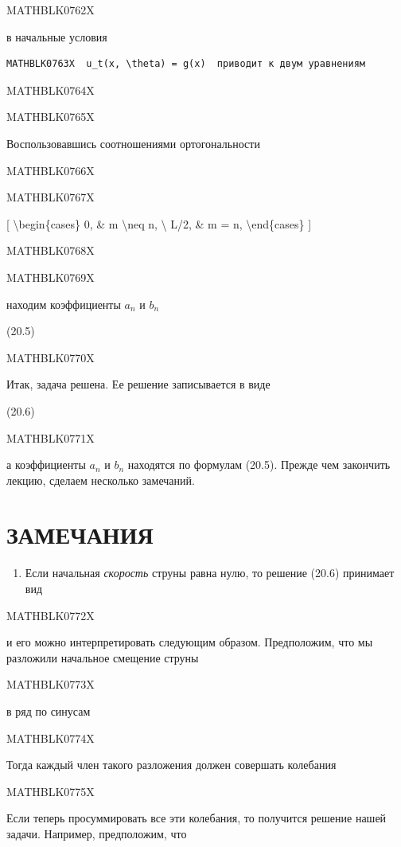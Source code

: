 \documentclass[
]{article}
\providecommand{\tightlist}{%
  \setlength{\itemsep}{0pt}\setlength{\parskip}{0pt}}
\begin{document}
{{MATHBLK0762X

в начальные условия

\begin{verbatim}
MATHBLK0763X  u_t(x, \theta) = g(x)  приводит к двум уравнениям
\end{verbatim}

MATHBLK0764X

MATHBLK0765X

Воспользовавшись соотношениями ортогональности

MATHBLK0766X

MATHBLK0767X

{[} \textbackslash begin\{cases\} 0, \& m \textbackslash neq n,
\textbackslash{} L/2, \& m = n, \textbackslash end\{cases\} {]}

MATHBLK0768X

MATHBLK0769X

находим коэффициенты \(a_n\) и \(b_n\)

(20.5)

MATHBLK0770X

Итак, задача решена. Ее решение записывается в виде

(20.6)

MATHBLK0771X

а коэффициенты \(a_n\) и \(b_n\) находятся по формулам (20.5). Прежде
чем закончить лекцию, сделаем несколько замечаний.

\section{ЗАМЕЧАНИЯ}\label{ux437ux430ux43cux435ux447ux430ux43dux438ux44f-5}

\begin{enumerate}
\def\labelenumi{\arabic{enumi}.}
\tightlist
\item
  Если начальная \emph{скорость} струны равна нулю, то решение (20.6)
  принимает вид
\end{enumerate}

MATHBLK0772X

и его можно интерпретировать следующим образом. Предположим, что мы
разложили начальное смещение струны

MATHBLK0773X

в ряд по синусам

MATHBLK0774X

Тогда каждый член такого разложения должен совершать колебания

MATHBLK0775X

Если теперь просуммировать все эти колебания, то получится решение нашей
задачи. Например, предположим, что

}}
\end{document}
